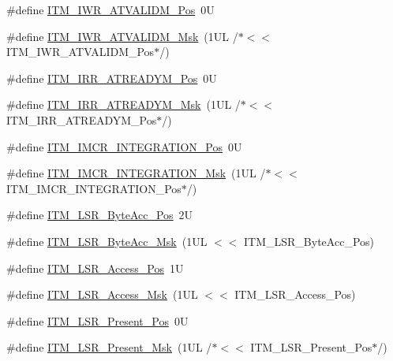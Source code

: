 \begin{DoxyCompactItemize}
\item 
\#define \hyperlink{group___c_m_s_i_s___i_t_m_ga04d3f842ad48f6a9127b4cecc963e1d7}{I\+T\+M\+\_\+\+I\+W\+R\+\_\+\+A\+T\+V\+A\+L\+I\+D\+M\+\_\+\+Pos}~0U
\item 
\#define \hyperlink{group___c_m_s_i_s___i_t_m_ga67b969f8f04ed15886727788f0e2ffd7}{I\+T\+M\+\_\+\+I\+W\+R\+\_\+\+A\+T\+V\+A\+L\+I\+D\+M\+\_\+\+Msk}~(1\+U\+L /$\ast$$<$$<$ I\+T\+M\+\_\+\+I\+W\+R\+\_\+\+A\+T\+V\+A\+L\+I\+D\+M\+\_\+\+Pos$\ast$/)
\item 
\#define \hyperlink{group___c_m_s_i_s___i_t_m_ga259edfd1d2e877a62e06d7a240df97f4}{I\+T\+M\+\_\+\+I\+R\+R\+\_\+\+A\+T\+R\+E\+A\+D\+Y\+M\+\_\+\+Pos}~0U
\item 
\#define \hyperlink{group___c_m_s_i_s___i_t_m_ga3dbc3e15f5bde2669cd8121a1fe419b9}{I\+T\+M\+\_\+\+I\+R\+R\+\_\+\+A\+T\+R\+E\+A\+D\+Y\+M\+\_\+\+Msk}~(1\+U\+L /$\ast$$<$$<$ I\+T\+M\+\_\+\+I\+R\+R\+\_\+\+A\+T\+R\+E\+A\+D\+Y\+M\+\_\+\+Pos$\ast$/)
\item 
\#define \hyperlink{group___c_m_s_i_s___i_t_m_ga08de02bf32caf48aaa29f7c68ff5d755}{I\+T\+M\+\_\+\+I\+M\+C\+R\+\_\+\+I\+N\+T\+E\+G\+R\+A\+T\+I\+O\+N\+\_\+\+Pos}~0U
\item 
\#define \hyperlink{group___c_m_s_i_s___i_t_m_ga8838bd3dd04c1a6be97cd946364a3fd2}{I\+T\+M\+\_\+\+I\+M\+C\+R\+\_\+\+I\+N\+T\+E\+G\+R\+A\+T\+I\+O\+N\+\_\+\+Msk}~(1\+U\+L /$\ast$$<$$<$ I\+T\+M\+\_\+\+I\+M\+C\+R\+\_\+\+I\+N\+T\+E\+G\+R\+A\+T\+I\+O\+N\+\_\+\+Pos$\ast$/)
\item 
\#define \hyperlink{group___c_m_s_i_s___i_t_m_gabfae3e570edc8759597311ed6dfb478e}{I\+T\+M\+\_\+\+L\+S\+R\+\_\+\+Byte\+Acc\+\_\+\+Pos}~2U
\item 
\#define \hyperlink{group___c_m_s_i_s___i_t_m_ga91f492b2891bb8b7eac5b58de7b220f4}{I\+T\+M\+\_\+\+L\+S\+R\+\_\+\+Byte\+Acc\+\_\+\+Msk}~(1\+U\+L $<$$<$ I\+T\+M\+\_\+\+L\+S\+R\+\_\+\+Byte\+Acc\+\_\+\+Pos)
\item 
\#define \hyperlink{group___c_m_s_i_s___i_t_m_ga144a49e12b83ad9809fdd2769094fdc0}{I\+T\+M\+\_\+\+L\+S\+R\+\_\+\+Access\+\_\+\+Pos}~1U
\item 
\#define \hyperlink{group___c_m_s_i_s___i_t_m_gac8ae69f11c0311da226c0c8ec40b3d37}{I\+T\+M\+\_\+\+L\+S\+R\+\_\+\+Access\+\_\+\+Msk}~(1\+U\+L $<$$<$ I\+T\+M\+\_\+\+L\+S\+R\+\_\+\+Access\+\_\+\+Pos)
\item 
\#define \hyperlink{group___c_m_s_i_s___i_t_m_gaf5740689cf14564d3f3fd91299b6c88d}{I\+T\+M\+\_\+\+L\+S\+R\+\_\+\+Present\+\_\+\+Pos}~0U
\item 
\#define \hyperlink{group___c_m_s_i_s___i_t_m_gaa5bc2a7f5f1d69ff819531f5508bb017}{I\+T\+M\+\_\+\+L\+S\+R\+\_\+\+Present\+\_\+\+Msk}~(1\+U\+L /$\ast$$<$$<$ I\+T\+M\+\_\+\+L\+S\+R\+\_\+\+Present\+\_\+\+Pos$\ast$/)
\end{DoxyCompactItemize}



